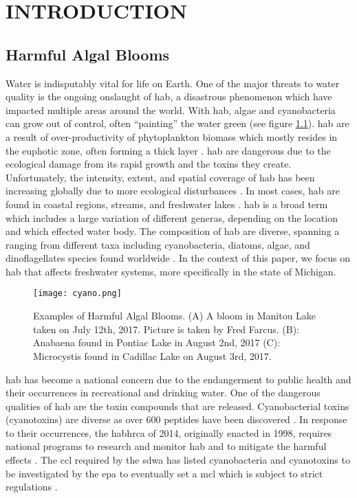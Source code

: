 \chapter{INTRODUCTION}
\section{Harmful Algal Blooms}

Water is indisputably vital for life on Earth. One of the major threats to water quality is the ongoing onslaught of \gls{hab}, a disastrous phenomenon which have impacted multiple areas around the world. With \gls{hab}, algae and cyanobacteria can grow out of control, often ``painting'' the water green (see figure \ref{fig:cyano}). \gls{hab} are a result of over-productivity of phytoplankton biomass which mostly resides in the euphotic zone, often forming a thick layer \cite{moore_richard_cyanobacterial_1993}.  \gls{hab} are dangerous due to the ecological damage from its rapid growth and the toxins they create. Unfortunately, the intensity, extent, and spatial coverage of \gls{hab} has been increasing globally due to more ecological disturbances \cite{codd_cyanobacterial_1999}. In most cases, \gls{hab} are found in coastal regions, streams, and freshwater lakes \cite{rastogi_cyanotoxin-microcystins:_2014}. \gls{hab} is a broad term which includes a large variation of different generas, depending on the location and which effected water body. The composition of \gls{hab} are diverse, spanning a ranging from  different taxa including cyanobacteria, diatoms, algae, and dinoflagellates species found worldwide \cite{dittmann_cyanobacterial_2012}. In the context of this paper, we focus on \gls{hab} that affects freshwater systems, more specifically in the state of Michigan.

\begin{figure}[!h]
	\texttt{[image: cyano.png]}
	\caption{
		Examples of Harmful Algal Blooms. (A) A bloom in Manitou Lake taken on July 12th, 2017. Picture is taken by Fred Farcus. (B): Anabaena found in Pontiac Lake in August 2nd, 2017  (C): Microcystis found in Cadillac Lake on August 3rd, 2017.
	}
	\label{fig:cyano}
\end{figure}


\gls{hab} has become a national concern due to the endangerment to public health and their occurrences in recreational and drinking water. One of the dangerous qualities of \gls{hab} are the toxin compounds that are released. Cyanobacterial toxins (cyanotoxins) are diverse as over 600 peptides have been discovered \cite{welker_cyanobacterial_2006}. In response to their occurrences, the \gls{habhrca} of 2014, originally enacted in 1998, requires national programs to research and monitor \gls{hab} and to mitigate the harmful effects \cite{noauthor_harmful_2014}. The \gls{ccl} required by the \gls{sdwa} has listed cyanobacteria and cyanotoxins to be investigated by the \gls{epa} to eventually set a \gls{mcl} which is subject to strict regulations \cite{usepa_drinking_2016}. 

